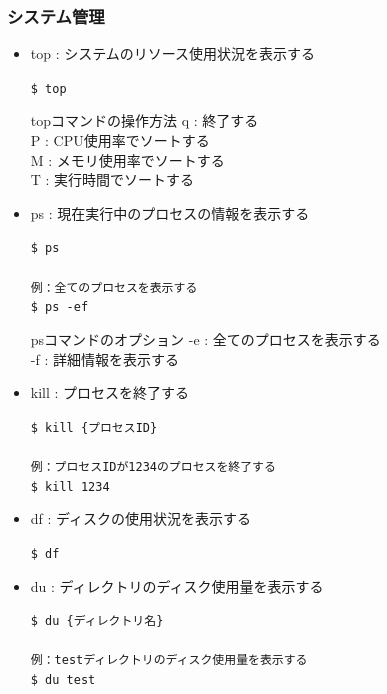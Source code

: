 \documentclass[a4paper, 11pt, dvipdfmx]{jsarticle}
\begin{document}
\subsubsection{システム管理}
\begin{itemize}
  \item top : システムのリソース使用状況を表示する
  \begin{terminalbox}
    \verb|$ top|
  \end{terminalbox}
  \begin{hosokubox}{topコマンドの操作方法}
    q : 終了する\\
    P : CPU使用率でソートする\\
    M : メモリ使用率でソートする\\
    T : 実行時間でソートする
  \end{hosokubox}
  \item ps : 現在実行中のプロセスの情報を表示する
  \begin{terminalbox}
    \verb|$ ps|\\\\
    \verb|例：全てのプロセスを表示する|\\
    \verb|$ ps -ef|
  \end{terminalbox}
  \begin{hosokubox}{psコマンドのオプション}
    -e : 全てのプロセスを表示する\\
    -f : 詳細情報を表示する
  \end{hosokubox}
  \item kill : プロセスを終了する
  \begin{terminalbox}
    \verb|$ kill {プロセスID}|\\\\
    \verb|例：プロセスIDが1234のプロセスを終了する|\\
    \verb|$ kill 1234|
  \end{terminalbox}
  \item df : ディスクの使用状況を表示する
  \begin{terminalbox}
    \verb|$ df|
  \end{terminalbox}
  \item du : ディレクトリのディスク使用量を表示する
  \begin{terminalbox}
    \verb|$ du {ディレクトリ名}|\\\\
    \verb|例：testディレクトリのディスク使用量を表示する|\\
    \verb|$ du test|
  \end{terminalbox}

\end{itemize}
\end{document}
